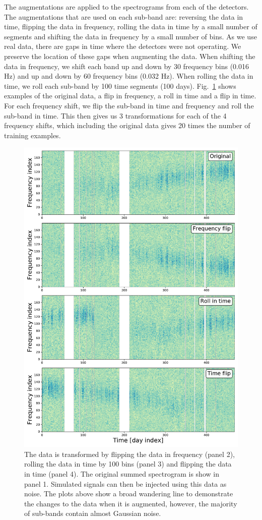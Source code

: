 %
The augmentations are applied to the spectrograms from each of the detectors.
The augmentations that are used on each sub-band are: reversing the data in
time, flipping the data in frequency, rolling the data in time by a small
number of segments and shifting the data in frequency by a small number of
bins. As we use real data, there are gaps in time where the detectors were not
operating. We preserve the location of these gaps when augmenting the data.
When shifting the data in frequency, we shift each band up and down by 30 frequency bins (0.016 Hz) and up and down by 60 frequency bins (0.032 Hz).
When rolling the data in time, we roll each sub-band by 100 time segments (100 days). 
Fig.~\ref{machine:data:augmentation:examples} shows examples of the original data, a flip in frequency, a roll in time and a flip in time.
For each frequency shift, we flip the sub-band in time and frequency and roll the sub-band in time.
This then gives us 3 transformations for each of the 4 frequency shifts, which including the original data gives 20 times the number of training examples.

\begin{figure}
	\centering
	\includegraphics[width=0.8\columnwidth]{C4_cnn/augmentation.pdf}
	\caption[How data is augmented, i.e. flipping in time and frequency.]{The data is transformed by flipping the data in frequency (panel 2),
		rolling the data in time by 100 bins (panel 3) and flipping the data in time
		(panel 4). The original summed spectrogram is show in panel 1. Simulated
		signals can then be injected using this data as noise. The plots above show a
		broad wandering line to demonstrate the changes to the data when it is
		augmented, however, the majority of sub-bands contain almost Gaussian
		noise. }
	\label{machine:data:augmentation:examples}
	
\end{figure}


